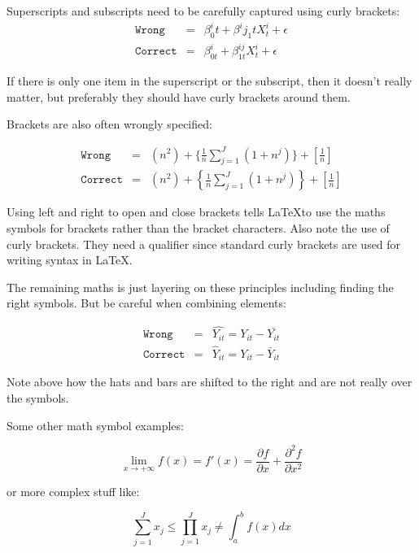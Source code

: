 \documentclass[11pt]{article}
\numberwithin{table}{section}   %
\begin{document}
Superscripts and subscripts need to be carefully captured using curly brackets:
\begin{eqnarray}
    \texttt{Wrong} &=& \beta^i_0t + \beta^ij_1t X^i_t + \epsilon \\  \nonumber
    \texttt{Correct} &=& \beta^{i}_{0t} + \beta^{ij}_{1t} X^i_t + \epsilon
\end{eqnarray}

If there is only one item in the superscript or the subscript, then it doesn't really matter, but preferably they should have curly brackets around them.

Brackets are also often wrongly specified:

\begin{eqnarray}
    \texttt{Wrong} &=&  (n^2) + \{\frac{1}{n} \sum^{J}_{j=1}{(1 + n^j)}\} + [\frac{1}{n}]   \\  \nonumber
    \texttt{Correct} &=& \left(n^2 \right) + \left\{\frac{1}{n}\sum^{J}_{j=1}{\left(1 + n^j\right)}\right\}  + \left[\frac{1}{n} \right]
\end{eqnarray}

Using left and right to open and close brackets tells \LaTeX to use the maths symbols for brackets rather than the bracket characters. Also note the use of curly brackets. They need a qualifier since standard curly brackets are used for writing syntax in \LaTeX.

The remaining maths is just layering on these principles including finding the right symbols. But be careful when combining elements:

\begin{eqnarray}
    \texttt{Wrong} &=& \hat{Y_{it}} = Y_{it} - \bar{Y_{it}} \\ \nonumber
    \texttt{Correct} &=& \hat{Y}_{it} = Y_{it} - \bar{Y}_{it} 
\end{eqnarray}

Note above how the hats and bars are shifted to the right and are not really over the symbols. 

Some other math symbol examples:

\begin{equation}
    \lim_{x \to +\infty} f(x) = f'(x) = \frac{\partial f}{\partial x} + \frac{\partial^2 f}{\partial x^2}
\end{equation}

or more complex stuff like:

\begin{equation}
    \sum_{j=1}^J x_{j} \leq \prod_{j=1}^J x_{j} \neq \int_{a}^{b} f(x) dx
\end{equation}
\end{document}
